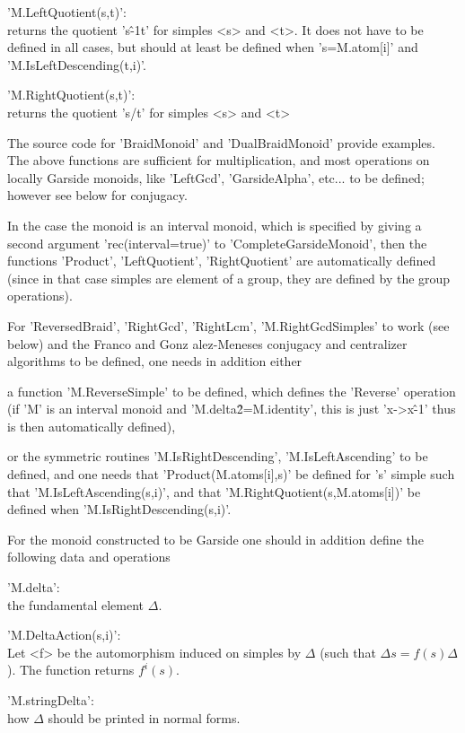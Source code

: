 'M.LeftQuotient(s,t)':\\  returns the  quotient 's\^-1\*t'  for simples <s>
and  <t>. It does not have to be  defined in all cases, but should at least
be defined when 's=M.atom[i]' and 'M.IsLeftDescending(t,i)'.

'M.RightQuotient(s,t)':\\ returns the quotient 's/t' for simples <s> and <t>

The  source code for 'BraidMonoid'  and 'DualBraidMonoid' provide examples.
The  above functions are sufficient for multiplication, and most operations
on  locally Garside monoids,  like 'LeftGcd', 'GarsideAlpha',  etc... to be
defined; however see below for conjugacy.

In  the case the monoid is an interval monoid, which is specified by giving
a  second argument 'rec(interval\:=true)'  to 'CompleteGarsideMonoid', then
the  functions 'Product', 'LeftQuotient', 'RightQuotient' are automatically
defined  (since  in  that  case  simples  are  element of a group, they are
defined by the group operations).

For  'ReversedBraid', 'RightGcd',  'RightLcm', 'M.RightGcdSimples'  to work
(see  below) and the Franco  and Gonz{ a}lez-Meneses conjugacy and
centralizer algorithms to be defined, one needs in addition either\:

a  function 'M.ReverseSimple'  to be  defined, which  defines the 'Reverse'
operation  (if 'M' is an  interval monoid and 'M.delta\^2=M.identity', this
is just 'x->x\^-1' thus is then automatically defined),

or  the symmetric routines 'M.IsRightDescending', 'M.IsLeftAscending' to be
defined,  and  one  needs  that  'Product(M.atoms[i],s)' be defined for 's'
simple such that 'M.IsLeftAscending(s,i)', and that
'M.RightQuotient(s,M.atoms[i])' be defined when 'M.IsRightDescending(s,i)'.

For  the monoid constructed to be Garside one should in addition define the
following data and operations\:

'M.delta':\\ the fundamental element $\Delta$.

'M.DeltaAction(s,i)':\\  Let <f> be the  automorphism induced on simples by
$\Delta$ (such that $\Delta s=f(s)\Delta$). The function returns $f^i(s)$.

'M.stringDelta':\\ how $\Delta$ should be printed in normal forms.

